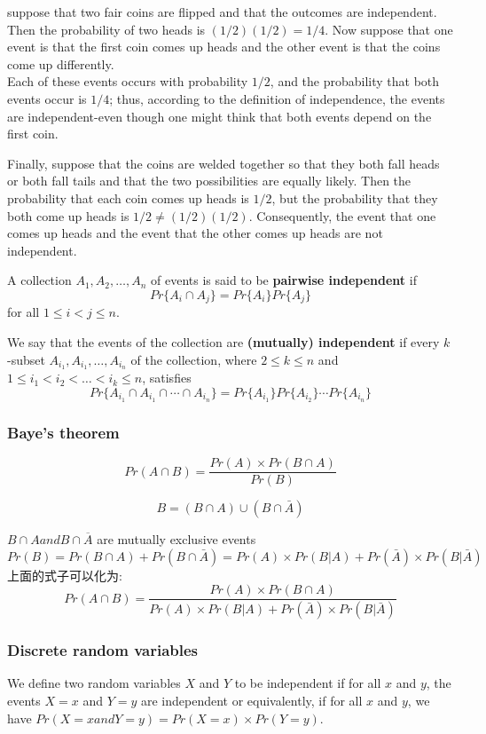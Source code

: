 \documentclass{article}
\begin{document}
\begin{example}
suppose that two fair coins are flipped and that the outcomes are independent. Then the probability of two heads is $(1/2)(1/2) = 1/4$.
Now suppose that one event is that the first coin comes up heads and the other event is that the coins come up differently.\\
Each of these events occurs with probability $1/2$, and the probability that both events occur is $1/4$;
thus, according to the definition of independence, the events are independent-even though one might think that both events depend on the first coin.

Finally, suppose that the coins are welded together so that they both fall heads or both fall tails and that the two possibilities are equally likely.
Then the probability that each coin comes up heads is $1/2$, but the probability that they both come up heads is $1/2 \neq (1/2)(1/2)$.
Consequently, the event that one comes up heads and the event that the other comes up heads are not independent.
\end{example}

A collection $A_1, A_2,\ldots, A_n$ of events is said to be \textbf{pairwise independent} if
$$Pr\{A_i \cap A_j\} = Pr\{A_i\}Pr\{A_j\}$$
for all $1 \leq i < j \leq n$.

We say that the events of the collection are \textbf{(mutually) independent}
if every $k$-subset $A_{i_1},A_{i_1},\ldots,A_{i_n}$ of the collection, where $2 \leq k \leq n$ and $1 \leq i_1< i_2< \ldots < i_k \leq n$, satisfies
$$ Pr\{A_{i_1} \cap A_{i_1} \cap \cdots \cap A_{i_n}\} = Pr\{A_{i_1}\} Pr\{A_{i_2}\} \cdots Pr\{A_{i_n}\} $$

\subsubsection{Baye's theorem}
$$ Pr(A\cap B)=\frac{Pr(A) \times Pr(B \cap A)}{Pr(B)} $$

$$ B=(B \cap A)\cup (B \cap \bar{A}) $$

\noindent
$B \cap A and B \cap \overline{A}$ are mutually exclusive events
$$ Pr(B)=Pr(B \cap A)+Pr(B \cap \bar{A}) =Pr(A) \times Pr(B|A)+Pr(\bar{A}) \times Pr(B|\bar{A}) $$
上面的式子可以化为:
$$ Pr(A\cap B)=\frac{Pr(A) \times Pr(B \cap A)}{Pr(A) \times Pr(B|A)+Pr(\bar{A}) \times Pr(B|\bar{A})} $$

\subsubsection{Discrete random variables}
We define two random variables $X$ and $Y$ to be independent if for all $x$ and $y$, the events $X=x$ and $Y=y$ are independent or equivalently, if for all $x$ and $y$, we have $Pr(X=x and Y=y)=Pr(X=x) \times Pr(Y=y)$.
\end{document}
